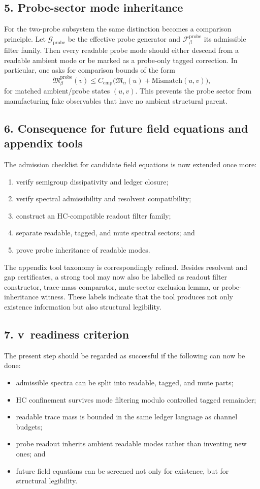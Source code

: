 \subsection*{5. Probe-sector mode inheritance}
For the two-probe subsystem the same distinction becomes a comparison principle.
Let $\mathcal G_{\mathrm{probe}}$ be the effective probe generator and
$\mathcal F^{\mathrm{probe}}_\beta$ its admissible filter family. Then every readable
probe mode should either descend from a readable ambient mode or be marked as a
probe-only tagged correction. In particular, one asks for comparison bounds of the
form
\[
\mathfrak M^{\mathrm{probe}}_\beta(v)
\le C_{\mathrm{cmp}}
\bigl( \mathfrak M_\alpha(u) + \mathrm{Mismatch}(u,v) \bigr),
\]
for matched ambient/probe states $(u,v)$. This prevents the probe sector from
manufacturing fake observables that have no ambient structural parent.

\subsection*{6. Consequence for future field equations and appendix tools}
The admission checklist for candidate field equations is now extended once more:
\begin{enumerate}[label=(\arabic*)]
  \item verify semigroup dissipativity and ledger closure;
  \item verify spectral admissibility and resolvent compatibility;
  \item construct an HC-compatible readout filter family;
  \item separate readable, tagged, and mute spectral sectors; and
  \item prove probe inheritance of readable modes.
\end{enumerate}
The appendix tool taxonomy is correspondingly refined. Besides resolvent and gap
certificates, a strong tool may now also be labelled as readout filter constructor,
trace-mass comparator, mute-sector exclusion lemma, or probe-inheritance witness.
These labels indicate that the tool produces not only existence information but also
structural legibility.

\subsection*{7. v\docversion\ readiness criterion}
The present step should be regarded as successful if the following can now be done:
\begin{itemize}
  \item admissible spectra can be split into readable, tagged, and mute parts;
  \item HC confinement survives mode filtering modulo controlled tagged remainder;
  \item readable trace mass is bounded in the same ledger language as channel budgets;
  \item probe readout inherits ambient readable modes rather than inventing new ones; and
  \item future field equations can be screened not only for existence, but for structural legibility.
\end{itemize}

